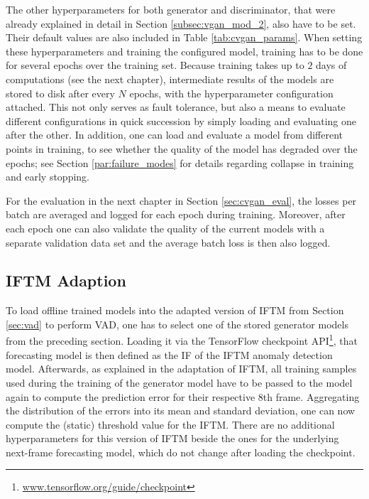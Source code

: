 The other hyperparameters for both generator and discriminator, that were already explained in detail in Section \ref{subsec:vgan_mod_2}, also have to be set. Their default values are also included in Table \ref{tab:cvgan_params}. When setting these hyperparameters and training the configured model, training has to be done for several epochs over the training set. Because training takes up to $2$ days of computations (see the next chapter), intermediate results of the models are stored to disk after every $N$ epochs, with the hyperparameter configuration attached. This not only serves as fault tolerance, but also a means to evaluate different configurations in quick succession by simply loading and evaluating one after the other. In addition, one can load and evaluate a model from different points in training, to see whether the quality of the model has degraded over the epochs; see Section \ref{par:failure_modes} for details regarding collapse in training and early stopping.

For the evaluation in the next chapter in Section \ref{sec:cvgan_eval}, the losses per batch are averaged and logged for each epoch during training. Moreover, after each epoch one can also validate the quality of the current models with a separate validation data set and the average batch loss is then also logged.


\subsection{IFTM Adaption} \label{subsec:framework_iftm}

To load offline trained models into the adapted version of IFTM from Section \ref{sec:vad} to perform VAD, one has to select one of the stored generator models from the preceding section. Loading it via the TensorFlow checkpoint API\footnote{\url{www.tensorflow.org/guide/checkpoint}}, that forecasting model is then defined as the IF of the IFTM anomaly detection model. Afterwards, as explained in the adaptation of IFTM, all training samples used during the training of the generator model have to be passed to the model again to compute the prediction error for their respective 8th frame. Aggregating the distribution of the errors into its mean and standard deviation, one can now compute the (static) threshold value for the IFTM. There are no additional hyperparameters for this version of IFTM beside the ones for the underlying next-frame forecasting model, which do not change after loading the checkpoint.

